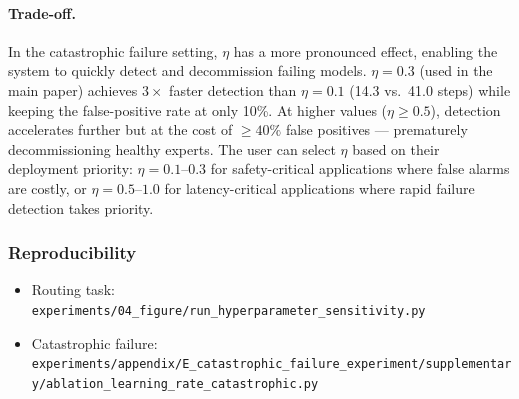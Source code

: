 \paragraph{Trade-off.}
In the catastrophic failure setting, $\eta$ has a more pronounced effect,
enabling the system to quickly detect and decommission failing models.
$\eta{=}0.3$ (used in the main paper) achieves $3\times$ faster detection
than $\eta{=}0.1$ (14.3 vs.\ 41.0 steps) while keeping the false-positive
rate at only 10\%.  At higher values ($\eta \geq 0.5$), detection accelerates
further but at the cost of $\geq 40\%$ false positives --- prematurely
decommissioning healthy experts.  The user can select $\eta$ based on their
deployment priority: $\eta{=}0.1$--$0.3$ for safety-critical applications
where false alarms are costly, or $\eta{=}0.5$--$1.0$ for latency-critical
applications where rapid failure detection takes priority.

\subsubsection{Reproducibility}

\begin{itemize}[noitemsep]
    \item Routing task: \texttt{experiments/04\_figure/run\_hyperparameter\_sensitivity.py}
    \item Catastrophic failure: \texttt{experiments/appendix/E\_catastrophic\_failure\_experiment/supplementary/ablation\_learning\_rate\_catastrophic.py}
\end{itemize}
